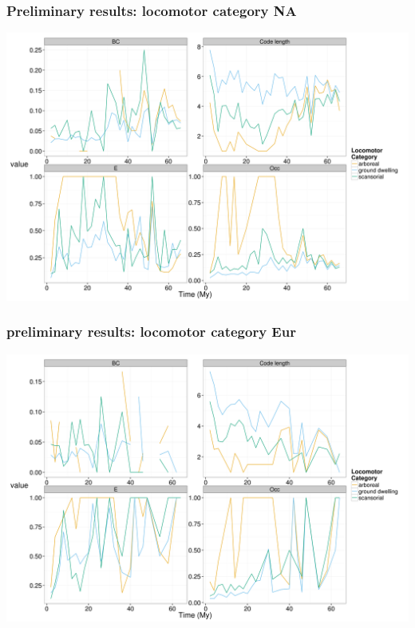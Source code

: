 \documentclass{beamer}
\begin{document}
\begin{frame}
  \frametitle{Preliminary results: locomotor category NA}

  \begin{center}
    \includegraphics[height = 0.8\textheight, width = \textwidth, keepaspectratio = true]{figure/na_lf}
  \end{center}
\end{frame}

\begin{frame}
  \frametitle{preliminary results: locomotor category Eur}

  \begin{center}
    \includegraphics[height = 0.8\textheight, width = \textwidth, keepaspectratio = true]{figure/er_lf}
  \end{center}
\end{frame}
\end{document}

